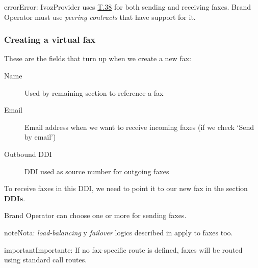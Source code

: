 \documentclass[letterpaper,10pt,spanish]{sphinxmanual}
\begin{document}
\begin{notice}{error}{Error:}
IvozProvider uses
\href{http://www.voip-info.org/wiki/view/T.38}{T.38} for both sending and receiving
faxes. Brand Operator must use \emph{peering contracts} that have support for it.
\end{notice}


\subsubsection{Creating a virtual fax}
\label{administration_portal/client/vpbx/faxes:creating-a-virtual-fax}
These are the fields that turn up when we create a new fax:
\begin{description}
\item[{Name}] \leavevmode{}\label{administration_portal/client/vpbx/faxes:term-name}
Used by remaining section to reference a fax

\item[{Email}] \leavevmode{}\label{administration_portal/client/vpbx/faxes:term-email}
Email address when we want to receive incoming faxes (if we check `Send
by email')

\item[{Outbound DDI}] \leavevmode{}\label{administration_portal/client/vpbx/faxes:term-outbound-ddi}
DDI used as source number for outgoing faxes

\end{description}

To receive faxes in this DDI, we need to point it to our new fax in the section
\textbf{DDIs}.

Brand Operator can choose one or more {\hyperref[administration_portal/brand/routing/outgoing_routings:outgoing\string-routings]{}} for sending faxes.

\begin{notice}{note}{Nota:}
\emph{load-balancing} y \emph{failover} logics described in {\hyperref[administration_portal/brand/routing/outgoing_routings:outgoing\string-routings]{}}
apply to faxes too.
\end{notice}

\begin{notice}{important}{Importante:}
If no fax-specific route is defined, faxes will be routed using
standard call routes.
\end{notice}
\end{document}
